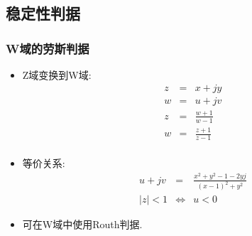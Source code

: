 \documentclass[table]{article}
\begin{document}
\subsection{稳定性判据}
\label{sec-5-2}

\begin{frame}
\frametitle{W域的劳斯判据}
\label{sec-5-2-1}

\begin{itemize}
\item Z域变换到W域:
       \begin{eqnarray*}
       	z & = & x+jy\\
       	w &= & u+jv \\
       	z & = &\frac{w+1}{w-1} \\
       	w &= & \frac{z+1}{z-1} \\
       \end{eqnarray*}
\item <2->等价关系:
       \begin{eqnarray*}
       u+jv &=& \frac{x^2+y^2-1-2yj}{(x-1)^2+y^2} \\
       |z|<1 &\Leftrightarrow& u<0 
       \end{eqnarray*}
\item <3->可在W域中使用Routh判据.
\end{itemize}
\end{frame}
\end{document}
